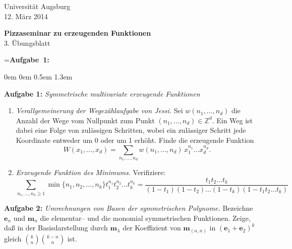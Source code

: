 \documentclass[a4paper,ngerman]{scrartcl}
\theoremstyle{definition}
\theoremstyle{plain}
\theoremstyle{remark}
\begin{document}
\vspace*{-4em}
\begin{flushright}Universität Augsburg \\ 12. März 2014\end{flushright}

\begin{center}\Large \textbf{Pizzaseminar zu erzeugenden Funktionen} \\
3. Übungsblatt
\end{center}
\vspace{1.5em}

\newbox{\mybox}
\setbox\mybox=\hbox{\textbf{Aufgabe 1:}}

\begin{list}{}{0em \leftmargin0em \itemindent0.5em \itemsep 1.3em}
\item[\textbf{Aufgabe 1:}] \emph{Symmetrische multivariate erzeugende Funktionen}
\begin{enumerate} 
\item \emph{Verallgemeinerung der Wegezählaufgabe von Jessi.} \newline
Sei $w(n_1,\ldots,n_d)$ die Anzahl der Wege vom Nullpunkt zum Punkt $(n_1,\ldots,n_d)\in\mathbb{Z}^d$. Ein Weg ist dabei eine Folge von zulässigen Schritten, wobei ein zulässiger Schritt jede Koordinate entweder um 0 oder um 1 erhöht. Finde die erzeugende Funktion
$$W(x_1,\ldots,x_d) = \sum_{n_1,\ldots,n_d} w(n_1,\ldots,n_d)\,x^{n_1}_1\ldots x^{n_d}_d .$$

\item \emph{Erzeugende Funktion des Minimums.} Verifiziere:
$$\sum_{n_1,\ldots,n_k\geq 1} \min\{n_1,n_2,\ldots,n_k\} t_1^{n_1}t_2^{n_2}\ldots t_k^{n_k} = 
\frac{t_1t_2\ldots t_k}{(1-t_1)(1-t_2)\ldots(1-t_k)(1-t_1t_2\ldots t_k)} $$
\end{enumerate}
\item[\textbf{Aufgabe 2:}] \emph{Umrechnungen von Basen der symmetrischen Polynome.} Bezeichne $\mathbf{e}_n$ und $\mathbf{m}_n$ die elementar-- und die monomial symmetrischen Funktionen. Zeige, daß in der Basisdarstellung durch $\mathbf{m}_\lambda$ der Koeffizient von $\mathbf{m}_{(n,n)}$ in $(\mathbf{e}_1+\mathbf{e}_2)^k$ gleich $\binom{k}{n}\binom{k-n}{n}$ ist.


\end{list}
\end{document}
